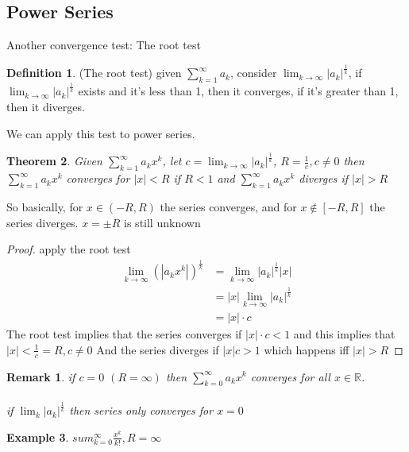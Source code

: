 \documentclass[12pt]{article}
\theoremstyle{plain}
\newtheorem*{remark}{Remark}
\newtheorem{theorem}{Theorem}[section]
\theoremstyle{definition}
\newtheorem{definition}[theorem]{Definition}
\newtheorem{example}[theorem]{Example}
\begin{document}
\subsection{Power Series}

Another convergence test: The root test

\begin{definition}
	(The root test) given $\sum^\infty_{k=1} a_k$, consider $\lim_{k\to\infty} |a_k|^{\frac{1}{k}}$, if $\lim_{k\to\infty} |a_k|^{\frac{1}{k}}$ exists and it's less than 1, then it converges, if it's greater than 1, then it diverges.
\end{definition}

We can apply this test to power series.

\begin{theorem}
	Given $\sum^\infty_{k=1} a_k x^k$, let $c=\lim_{k\to\infty} |a_k|^{\frac{1}{k}}$, $R = \frac{1}{c}, c\neq 0$ then $\sum^\infty_{k=1} a_k x^k$ converges for $|x| <R$ if $R<1$ and $\sum^\infty_{k=1} a_k x^k$ diverges if $|x| > R$
\end{theorem}

So basically, for $x \in (-R, R)$ the series converges, and for $x \not\in [-R, R]$ the series diverges. $x = \pm R$ is still unknown

\begin{proof}
	apply the root test
	\begin{align*}
		\lim_{k\to\infty} (| a_k x^k |)^{\frac{1}{k}} &= \lim_{k\to\infty} | a_k |^{\frac{1}{k}} |x|\\
		&= |x| \lim_{k\to\infty} | a_k |^{\frac{1}{k}}\\
		&= |x| \cdot c
	\end{align*}
	The root test implies that the series converges if $|x|\cdot c < 1$ and this implies that $|x| < \frac{1}{c} = R, c \neq 0$ And the series diverges if $|x| c > 1$ which happens iff $|x| > R$
	
\end{proof}

\begin{remark}
	if $c=0$ $(R = \infty)$ then $\sum^\infty_{k=0} a_k x^k$ converges for all $x \in \mathbb{R}$.\\
	\\
	if $\lim_k |a_k|^{\frac{1}{k}}$ then series only converges for $x=0$
\end{remark}

\begin{example}
	$sum^\infty_{k=0} \frac{x^k}{k!}, R = \infty$
\end{example}
\end{document}
